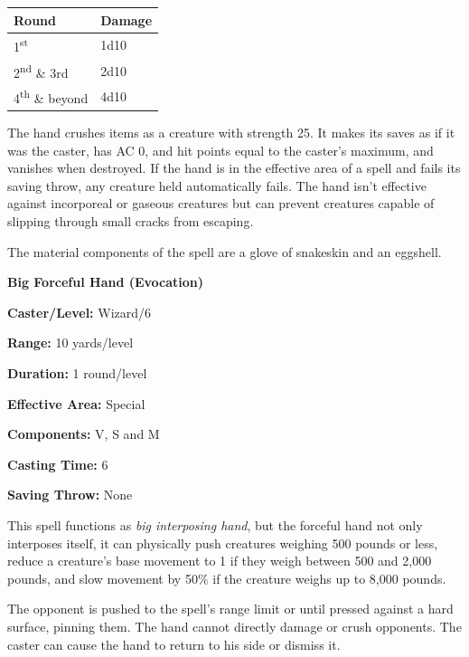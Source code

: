 \begin{multicols}{2}
\noindent
\begin{tabular}{|p{}|p{}|}
\hline
Round	& Damage \\
\hline\hline
\rowcolor[gray]{.9}1\textsuperscript{st}	& 1d10 \\
2\textsuperscript{nd} \& 3rd	& 2d10 \\
\rowcolor[gray]{.9}4\textsuperscript{th} \& beyond	& 4d10 \\
\hline
\end{tabular}

The hand crushes items as a creature with strength 25.  It makes its saves as if it was the caster, has AC 0, and hit points equal to the caster's maximum, and vanishes when destroyed.  If the hand is in the effective area of a spell and fails its saving throw, any creature held automatically fails.  The hand isn't effective against incorporeal or gaseous creatures but can prevent creatures capable of slipping through small cracks from escaping.  

The material components of the spell are a glove of snakeskin and an eggshell.

\vspace{1em}

\noindent
\begin{minipage}{\columnwidth}

\noindent \textbf{Big Forceful Hand (Evocation)}

\noindent \textbf{Caster/Level:} Wizard/6

\noindent \textbf{Range:} 10 yards/level

\noindent \textbf{Duration:} 1 round/level

\noindent \textbf{Effective Area:} Special

\noindent \textbf{Components:} V, S and M

\noindent \textbf{Casting Time:} 6

\noindent \textbf{Saving Throw:} None

\end{minipage}

This spell functions as \textit{big interposing hand}, but the forceful hand not only interposes itself, it can physically push creatures weighing 500 pounds or less, reduce a creature's base movement to 1 if they weigh between 500 and 2,000 pounds, and slow movement by 50\% if the creature weighs up to 8,000 pounds.

The opponent is pushed to the spell's range limit or until pressed against a hard surface, pinning them.  The hand cannot directly damage or crush opponents.  The caster can cause the hand to return to his side or dismiss it.


\end{multicols}
